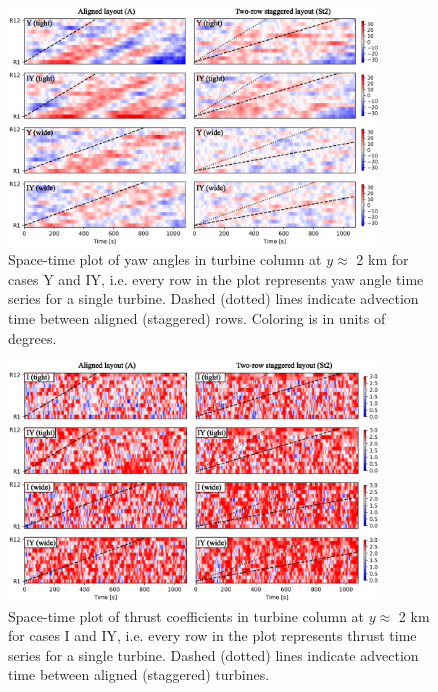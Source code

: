\documentclass[a4paper]{jpconf}
\begin{document}
\begin{figure}[t]
	\centering
	\includegraphics[width=0.875\textwidth]{Torque18/yaw_angles}
	\caption{Space-time plot of yaw angles in turbine column at $y \approx $ 2 km for cases Y and IY, i.e. every row in the plot represents yaw angle time series for a single turbine. Dashed (dotted) lines indicate advection time between aligned (staggered) rows. Coloring is in units of degrees. \label{fig:yaw}}
\end{figure}


\begin{figure}[h!]
	\centering
	\includegraphics[width=0.875\textwidth]{Torque18/ctfilts}
	\caption{Space-time plot of thrust coefficients in turbine column at $y \approx $ 2 km for cases I and IY, i.e. every row in the plot represents thrust time series for a single turbine. Dashed (dotted) lines indicate advection time between aligned (staggered) turbines. \label{fig:ctfilt}}
\end{figure}
\end{document}

